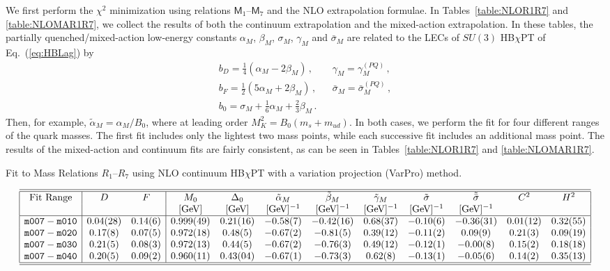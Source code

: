 \documentclass[twocolumn,nofootinbib,prd,aps,superscriptaddress,tightenlines]{revtex4}
\def\mreln{ \mathsf{M} }
\def\eqref#1{{(\ref{#1})}}
\def\s{\sigma}
\def\a{\alpha}
\def\b{\beta}
\def\g{\gamma}
\def\ufont#1{\text{#1}}
\begin{document}
We first perform the $\chi^2$ minimization using relations $\mreln_1$--$\mreln_7$ and the NLO extrapolation formulae.  In Tables~\ref{table:NLOR1R7} and \ref{table:NLOMAR1R7}, we collect the results of both the continuum extrapolation and the mixed-action extrapolation.  In these tables, the partially quenched/mixed-action low-energy constants $\a_M$, $\b_M$, $\s_M$, $\g_M$ and $\bar{\s}_M$ are related to the LECs of $SU(3)$ HB$\chi$PT of Eq.~\eqref{eq:HBLag} by
\begin{align}
&b_D = \frac{1}{4}\left( \a_M - 2\b_M \right)\, ,& 
	&\g_M = \g_M^{(PQ)}\, ,&
\\
&b_F = \frac{1}{2} \left( 5\a_M + 2\b_M \right)\, ,&
	&\bar{\s}_M = \bar{\s}_M^{(PQ)}\, ,&
\\
&b_0 = \s_M + \frac{1}{6}\a_M + \frac{2}{3}\b_M\, .&
\end{align}
Then, for example, $\tilde{\a}_M = \a_M / B_0$, where at leading order $M_K^2 = B_0 (m_s + m_{ud})$.  In both cases, we perform the fit for four different ranges of the quark masses.  The first fit includes only the lightest two mass points, while each successive fit includes an additional mass point.  The results of the mixed-action and continuum fits are fairly consistent, as can be seen in Tables~\ref{table:NLOR1R7} and \ref{table:NLOMAR1R7}.
\begin{table*}
\caption{\label{table:NLOR1R7} Fit to Mass Relations $R_1$--$R_7$ using NLO continuum HB$\chi$PT with a variation projection (VarPro) method.}
\begin{eqnarray*}
\begin{array}{|c|cc|ccccccccc|}
\hline\hline
\textrm{Fit Range}& D& F& M_0& \Delta_0& \tilde{\a}_M& \tilde{\b}_M& \tilde{\g}_M& \tilde{\s}& \tilde{\bar{\s}}& C^2& H^2\\
&&& [\ufont{GeV}]& [\ufont{GeV}]& [\ufont{GeV}] ^{-1}& [\ufont{GeV}] ^{-1}& [\ufont{GeV}]^{-1}& [\ufont{GeV}]^{-1} & [\ufont{GeV}] ^{-1}&& \\
\hline
\texttt{m007}-\texttt{m010}& 
	0.04(28)& 0.14(6)& 0.999(49)& 0.21(16)& -0.58(7)& -0.42(16)& 0.68(37)& -0.10(6)& -0.36(31)& 0.01(12)& 0.32(55) \\
\texttt{m007}-\texttt{m020}& 
	0.17(8)& 0.07(5)& 0.972(18)& 0.48(5)& -0.67(2)& -0.81(5)& 0.39(12)& -0.11(2)& 0.09(9)& 0.21(3)& 0.09(19)\\
\texttt{m007}-\texttt{m030}& 
	0.21(5)& 0.08(3)& 0.972(13)& 0.44(5)& -0.67(2)& -0.76(3)& 0.49(12)& -0.12(1)& -0.00(8)& 0.15(2)& 0.18(18)\\
\texttt{m007}-\texttt{m040}& 
	0.20(5)& 0.09(2)& 0.960(11)& 0.43(04)& -0.67(1)& -0.73(3)& 0.62(8)& -0.13(1)& -0.05(6)& 0.14(2)& 0.35(13) \\
\hline\hline
\end{array}
\end{eqnarray*}
\end{table*}
\end{document}

